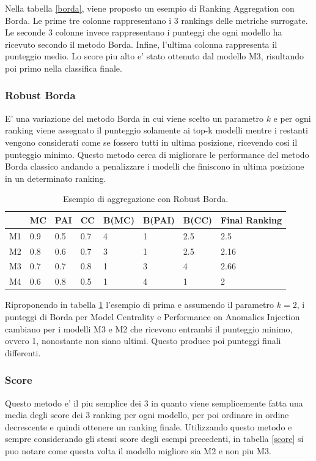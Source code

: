 Nella tabella \ref{borda}, viene proposto un esempio di Ranking Aggregation con Borda. Le prime tre colonne rappresentano i 3 rankings delle metriche surrogate. Le seconde 3 colonne invece rappresentano i punteggi che ogni modello ha ricevuto secondo il metodo Borda. Infine, l'ultima colonna rappresenta il punteggio medio. Lo score piu alto e' stato ottenuto dal modello M3, risultando poi primo nella classifica finale.
\subsubsection{Robust Borda}
E' una variazione del metodo Borda in cui viene scelto un parametro $k$ e per ogni ranking viene assegnato il punteggio solamente ai top-k modelli mentre i restanti vengono considerati come se fossero tutti in ultima posizione, ricevendo cosi il punteggio minimo. Questo metodo cerca di migliorare le performance del metodo Borda classico andando a penalizzare i modelli che finiscono in ultima posizione in un determinato ranking.

\begin{table}

    \centering
\begin{tabular}{|l|l|l|l|l|l|l|l|}
	\hline
	   & MC  & PAI & CC  & B(MC) & B(PAI) & B(CC) & Final Ranking \\ \hline
	M1 & 0.9 & 0.5 & 0.7 & 4     & 1      & 2.5   & 2.5           \\ \hline
	M2 & 0.8 & 0.6 & 0.7 & 3     & 1      & 2.5   & 2.16          \\ \hline
	M3 & 0.7 & 0.7 & 0.8 & 1     & 3      & 4     & 2.66          \\ \hline
	M4 & 0.6 & 0.8 & 0.5 & 1     & 4      & 1     & 2             \\ \hline
\end{tabular}
\caption{\label{rborda}Esempio di aggregazione con Robust Borda.}
\end{table}

Riproponendo in tabella \ref{rborda} l'esempio di prima e assumendo il parametro \(k=2\), i punteggi di Borda per Model Centrality e Performance on Anomalies Injection cambiano per i modelli M3 e M2 che ricevono entrambi il punteggio minimo, ovvero 1, nonostante non siano ultimi. Questo produce poi punteggi finali differenti.
\subsubsection{Score}
Questo metodo e' il piu semplice dei 3 in quanto viene semplicemente fatta una media degli score dei 3 ranking per ogni modello, per poi ordinare in ordine decrescente e quindi ottenere un ranking finale.
Utilizzando questo metodo e sempre considerando gli stessi score degli esempi precedenti, in tabella \ref{score} si puo notare come questa volta il modello migliore sia M2 e non piu M3.

